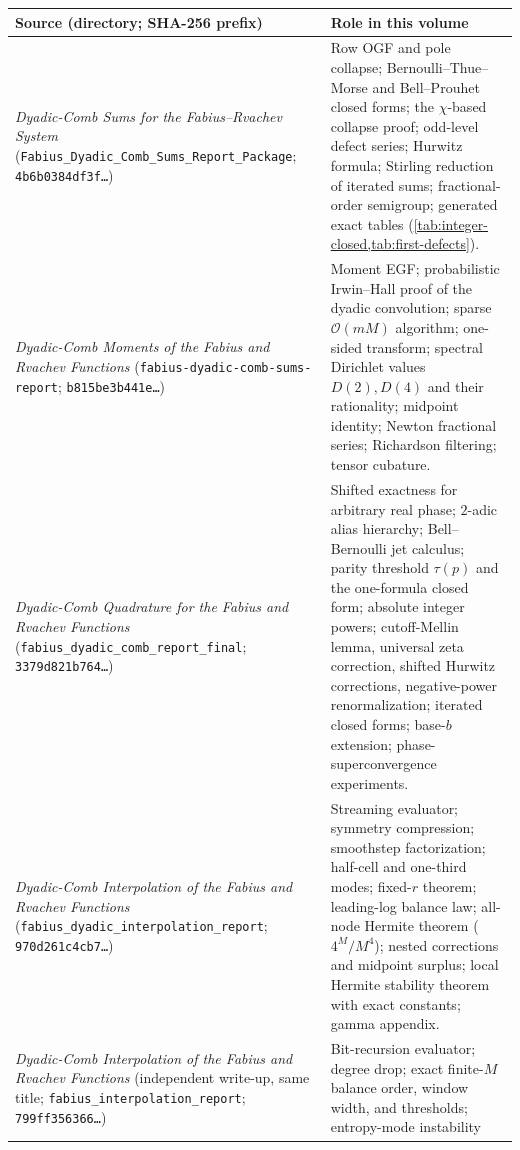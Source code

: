 \documentclass[11pt,oneside]{article}
\numberwithin{equation}{section}
\theoremstyle{definition}
\theoremstyle{remark}
\newcommand{\bigO}{\mathcal O}
\begin{document}
\begin{center}
\small
\begin{tabular}{@{}p{}p{}@{}}
\toprule
Source (directory; SHA-256 prefix) & Role in this volume \\
\midrule
\emph{Dyadic-Comb Sums for the Fabius--Rvachev System}
(\nolinkurl{Fabius_Dyadic_Comb_Sums_Report_Package};
\texttt{4b6b0384df3f\ldots})
& Row OGF and pole collapse; Bernoulli--Thue--Morse and Bell--Prouhet
closed forms; the $\chi$-based collapse proof; odd-level defect
series; Hurwitz formula; Stirling reduction of iterated sums;
fractional-order semigroup; generated exact tables
(\cref{tab:integer-closed,tab:first-defects}). \\
\addlinespace
\emph{Dyadic-Comb Moments of the Fabius and Rvachev Functions}
(\nolinkurl{fabius-dyadic-comb-sums-report};
\texttt{b815be3b441e\ldots})
& Moment EGF; probabilistic Irwin--Hall proof of the dyadic
convolution; sparse $\bigO(mM)$ algorithm; one-sided transform;
spectral Dirichlet values $D(2),D(4)$ and their rationality;
midpoint identity; Newton fractional series; Richardson filtering;
tensor cubature. \\
\addlinespace
\emph{Dyadic-Comb Quadrature for the Fabius and Rvachev Functions}
(\nolinkurl{fabius_dyadic_comb_report_final};
\texttt{3379d821b764\ldots})
& Shifted exactness for arbitrary real phase; $2$-adic alias
hierarchy; Bell--Bernoulli jet calculus; parity threshold
$\tau(p)$ and the one-formula closed form; absolute integer powers;
cutoff-Mellin lemma, universal zeta correction, shifted Hurwitz
corrections, negative-power renormalization; iterated closed forms;
base-$b$ extension; phase-superconvergence experiments. \\
\addlinespace
\emph{Dyadic-Comb Interpolation of the Fabius and Rvachev Functions}
(\nolinkurl{fabius_dyadic_interpolation_report};
\texttt{970d261c4cb7\ldots})
& Streaming evaluator; symmetry compression; smoothstep
factorization; half-cell and one-third modes; fixed-$r$ theorem;
leading-log balance law; all-node Hermite theorem
($4^{M}/M^{4}$); nested corrections and midpoint surplus; local
Hermite stability theorem with exact constants; gamma appendix. \\
\addlinespace
\emph{Dyadic-Comb Interpolation of the Fabius and Rvachev Functions}
(independent write-up, same title;
\nolinkurl{fabius_interpolation_report};
\texttt{799ff356366\ldots})
& Bit-recursion evaluator; degree drop; exact finite-$M$ balance
order, window width, and thresholds; entropy-mode instability

\end{tabular}
\end{center}
\end{document}
